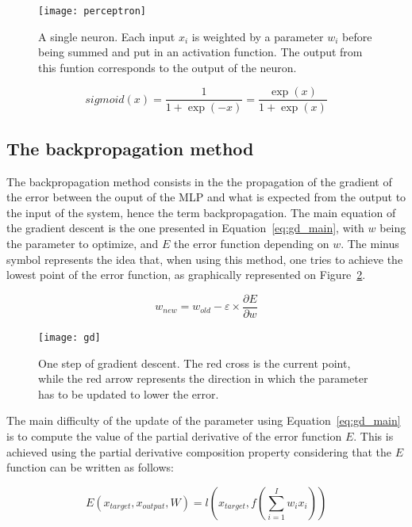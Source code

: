     \begin{figure}[h]
        \centering
        \texttt{[image: perceptron]}
        \caption{A single neuron. Each input $x_i$ is weighted by a parameter $w_i$ before being summed and put in an activation function. The output from this funtion corresponds to the output of the neuron.}
\label{fig:neuron}
    \end{figure}

    \begin{equation}
        sigmoid(x) = \frac{1}{1 + \exp(-x)} = \frac{\exp(x)}{1 + \exp(x)}
        \label{eq:sigmoid}
    \end{equation}

    \subsection{The backpropagation method}
    The backpropagation method consists in the the propagation of the gradient of the error between the ouput of the MLP and what is expected from the output to the input of the system, hence the term backpropagation. The main equation of the gradient descent is the one presented in Equation~\ref{eq:gd_main}, with $w$ being the parameter to optimize, and $E$ the error function depending on $w$. The minus symbol represents the idea that, when using this method, one tries to achieve the lowest point of the error function, as graphically represented on Figure~\ref{fig:gd}. 

\begin{equation}
    w_{new} = w_{old} - \varepsilon \times \frac{\partial E}{\partial w}
    \label{eq:gd_main}
\end{equation}

    \begin{figure}[h]
        \centering
        \texttt{[image: gd]}
        \caption{One step of gradient descent. The red cross is the current point, while the red arrow represents the direction in which the parameter has to be updated to lower the error.}
\label{fig:gd}
    \end{figure}

    The main difficulty of the update of the parameter using Equation~\ref{eq:gd_main} is to compute the value of the partial derivative of the error function $E$. This is achieved using the partial derivative composition property considering that the $E$ function can be written as follows:

    \begin{equation}
        E\left(x_{target}, x_{output}, W\right) = l\left(x_{target}, f\left(\sum_{i=1}^I w_i x_i\right)\right)
        \label{eq:error_function}
    \end{equation}

